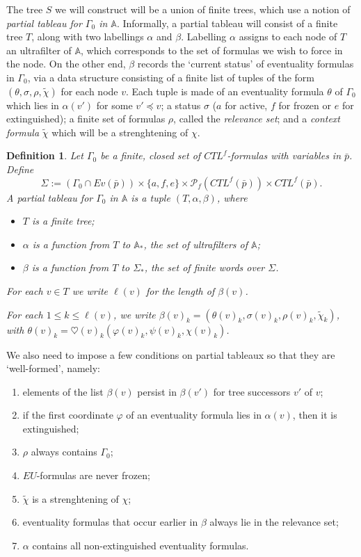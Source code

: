 \documentclass[11pt]{article}
\newcommand{\A}{{\mathbb A}}
\newcommand{\Evp}{{Ev(\bar{p})}}
\newtheorem{definition}{Definition}[section]
\begin{document}
The tree $S$ we will construct will be a union of finite trees, which use a notion of \emph{partial tableau for $\Gamma_0$ in $\A$}. Informally, a partial tableau will consist of a finite tree $T$, along with two labellings $\alpha$ and $\beta$. Labelling $\alpha$ assigns to each node of $T$ an ultrafilter of $\A$, which corresponds to the set of formulas we wish to force in the node. On the other end, $\beta$ records the `current status' of eventuality formulas in $\Gamma_0$, via a data structure consisting of a finite list of tuples of the form $(\theta,\sigma,\rho,\tilde{\chi})$ for each node $v$. Each tuple is made of an eventuality formula $\theta$ of $\Gamma_0$ which lies in $\alpha(v')$ for some $v'\preceq v$; a status $\sigma$ ($a$ for active, $f$ for frozen or $e$ for extinguished); a finite set of formulas $\rho$, called the \emph{relevance set}; and a \emph{context formula} $\tilde{\chi}$ which will be a strenghtening of $\chi$.

\begin{definition}\label{partial_tableau}
    Let $\Gamma_0$ be a finite, closed set of $CTL^f$-formulas with variables in $\bar{p}$. Define \[\Sigma:=(\Gamma_0\cap\Evp)\times\{a,f,e\}\times\mathcal{P}_f(CTL^f(\bar{p}))\times CTL^f(\bar{p}).\] A \emph{partial tableau for $\Gamma_0$ in $\A$} is a tuple $(T,\alpha,\beta)$, where
    \begin{itemize}
        \setlength\itemsep{0em}
        \item $T$ is a finite tree;
        \item $\alpha$ is a function from $T$ to $\A_*$, the set of ultrafilters of $\A$;
        \item $\beta$ is a function from $T$ to $\Sigma_*$, the set of finite words over $\Sigma$.
    \end{itemize}

    For each $v\in T$ we write $\ell(v)$ for the length of $\beta(v)$. 
    
    For each $1\leq k\leq \ell(v)$, we write $\beta(v)_k=(\theta(v)_k,\sigma(v)_k,\rho(v)_k,\tilde{\chi}_k)$, with $\theta(v)_k=\heartsuit(v)_k(\varphi(v)_k,\psi(v)_k,\chi(v)_k)$.
\end{definition}

We also need to impose a few conditions on partial tableaux so that they are `well-formed', namely:
\begin{enumerate}[label=(\alph*)]
    \setlength\itemsep{0em}
    \item elements of the list $\beta(v)$ persist in $\beta(v')$ for tree successors $v'$ of $v$;
    \item if the first coordinate $\varphi$ of an eventuality formula lies in $\alpha(v)$, then it is extinguished;
    \item $\rho$ always contains $\Gamma_0$; 
    \item $EU$-formulas are never frozen;
    \item $\tilde{\chi}$ is a strenghtening of $\chi$;
    \item eventuality formulas that occur earlier in $\beta$ always lie in the relevance set;
    \item $\alpha$ contains all non-extinguished eventuality formulas.
\end{enumerate}
\end{document}
